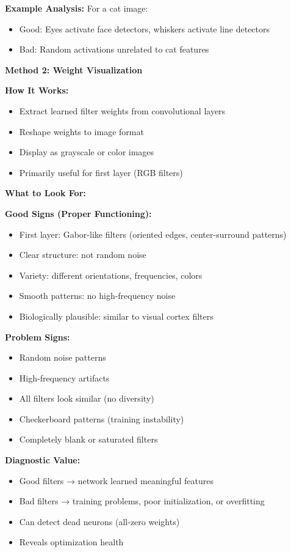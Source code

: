 \documentclass[12pt]{article}
\newcommand{\explanation}[1]{{\color{explanationcolor}#1}}
\begin{document}
\begin{enumerate}[(a)]
{{    \textbf{Example Analysis:}
    For a cat image:
    \begin{itemize}
        \item Good: Eyes activate face detectors, whiskers activate line detectors
        \item Bad: Random activations unrelated to cat features
    \end{itemize}
    }
    
    \textbf{Method 2: Weight Visualization}
    
    \explanation{
    \textbf{How It Works:}
    \begin{itemize}
        \item Extract learned filter weights from convolutional layers
        \item Reshape weights to image format
        \item Display as grayscale or color images
        \item Primarily useful for first layer (RGB filters)
    \end{itemize}
    
    \textbf{What to Look For:}
    
    \textbf{Good Signs (Proper Functioning):}
    \begin{itemize}
        \item First layer: Gabor-like filters (oriented edges, center-surround patterns)
        \item Clear structure: not random noise
        \item Variety: different orientations, frequencies, colors
        \item Smooth patterns: no high-frequency noise
        \item Biologically plausible: similar to visual cortex filters
    \end{itemize}
    
    \textbf{Problem Signs:}
    \begin{itemize}
        \item Random noise patterns
        \item High-frequency artifacts
        \item All filters look similar (no diversity)
        \item Checkerboard patterns (training instability)
        \item Completely blank or saturated filters
    \end{itemize}
    
    \textbf{Diagnostic Value:}
    \begin{itemize}
        \item Good filters → network learned meaningful features
        \item Bad filters → training problems, poor initialization, or overfitting
        \item Can detect dead neurons (all-zero weights)
        \item Reveals optimization health
    \end{itemize}
    }
    
}
\end{enumerate}
\end{document}
